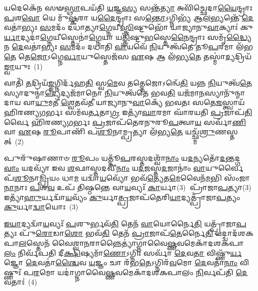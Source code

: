 \setcounter{anuvakam}{0}
𑌯𑌦𑍇𑌕𑍇᳴𑌨 𑌸𑍟\-\ul{𑌸𑍍𑌥𑌾}\-𑌪𑌯᳴𑌤𑌿 \ul{𑌯}\-𑌜𑍍𑌞\-\ul{𑌸𑍍𑌯} 𑌸𑌨𑍍𑌤᳴\-\ul{𑌤𑍍𑌯𑌾} 𑌅𑌵𑌿᳴𑌚𑍍𑌛𑍇𑌦𑌾\-\ul{𑌯𑍈}\-𑌨𑍍𑌦𑍍𑌰𑌾𑌃 \ul{𑌪}\-𑌶\-\ul{𑌵𑍋} 𑌯𑍇 𑌮𑍁᳴\-\ul{𑌷𑍍𑌕}\-𑌰𑌾 𑌯\-\ul{𑌦𑍈}\-𑌨𑍍𑌦𑍍𑌰𑌾𑌃 𑌸\-\ul{𑌨𑍍𑌤𑍋}\-\-𑌽𑌗𑍍𑌨𑌿𑌭𑍍𑌯᳴ 𑌆\-\ul{𑌲}\-𑌭𑍍𑌯𑌨𑍍𑌤𑍇᳴ \ul{𑌦𑍇}\-𑌵𑌤𑌾॑𑌭𑍍𑌯𑌃 \ul{𑌸}\-𑌮𑌦𑌂᳴ 𑌦𑌧𑌾𑌤𑍍𑌯𑌾\-\ul{𑌗𑍍𑌨𑍇}\-𑌯𑍀\-\ul{𑌸𑍍𑌤𑍍𑌰𑌿}\-𑌷𑍍𑌟𑍁𑌭𑍋᳴ 𑌯𑌾𑌜𑍍𑌯𑌾𑌨𑍁\-\ul{𑌵𑌾}\-𑌕𑍍𑌯𑌾𑌃॑ 𑌕𑍁\-\ul{𑌰𑍍𑌯𑌾}\-𑌦𑍍𑌯𑌦𑌾॑\-\ul{𑌗𑍍𑌨𑍇}\-𑌯𑍀𑌸𑍍𑌤𑍇𑌨𑌾॑\-\ul{𑌗𑍍𑌨𑍇}\-𑌯𑌾 𑌯\-\ul{𑌤𑍍𑌤𑍍𑌰𑌿}\-𑌷𑍍𑌟𑍁\-\ul{𑌭}\-𑌸𑍍𑌤𑍇\-\ul{𑌨𑍈}\-𑌨𑍍𑌦𑍍𑌰𑌾𑌃 𑌸𑌮𑍃᳴\-\ul{𑌦𑍍𑌧𑍍𑌯𑍈} 𑌨 \ul{𑌦𑍇}\-𑌵𑌤𑌾॑𑌭𑍍𑌯𑌃 \ul{𑌸}\-𑌮𑌦𑌂᳴ 𑌦𑌧𑌾𑌤𑌿 \ul{𑌵𑌾}\-𑌯𑌵𑍇᳴ \ul{𑌨𑌿}\-𑌯𑍁𑌤𑍍𑌵᳴𑌤𑍇 𑌤𑍂\-\ul{𑌪}\-𑌰𑌮𑌾 𑌲᳴𑌭\-\ul{𑌤𑍇} 𑌤𑍇\-\ul{𑌜𑍋}\-\-𑌽𑌗𑍍𑌨𑍇\-\ul{𑌰𑍍𑌵𑌾}\-𑌯𑍁𑌸𑍍𑌤𑍇𑌜᳴𑌸 \ul{𑌏}\-𑌷 𑌆 𑌲᳴𑌭𑍍𑌯\-\ul{𑌤𑍇} 𑌤𑌸𑍍𑌮𑌾॑\-\ul{𑌦𑍍𑌯}\-𑌦𑍍𑌰𑌿𑌯᳴\-\ul{𑌙𑍍𑌵𑌾}\-𑌯𑍁𑌃~(1)

𑌵𑌾𑌤𑌿᳴ \ul{𑌤}\-𑌦𑍍𑌰𑌿𑌯᳴\-\ul{𑌙𑍍𑌙}\-𑌗𑍍𑌨𑌿𑌰𑍍𑌦᳴𑌹\-\ul{𑌤𑌿} 𑌸𑍍𑌵\-\ul{𑌮𑍇}\-𑌵 𑌤𑌤𑍍𑌤𑍇𑌜𑍋\-𑌽𑌨𑍍𑌵𑍇᳴\-\ul{𑌤𑌿} 𑌯𑌨𑍍𑌨 \ul{𑌨𑌿}\-𑌯𑍁𑌤𑍍𑌵᳴\-\ul{𑌤𑍇} 𑌸𑍍𑌯𑌾𑌦𑍁𑌨𑍍𑌮𑌾॑\-\ul{𑌦𑍍𑌯𑍇}\-𑌦𑍍𑌯𑌜᳴𑌮𑌾𑌨𑍋 \ul{𑌨𑌿}\-𑌯𑍁𑌤𑍍𑌵᳴𑌤𑍇 𑌭𑌵\-\ul{𑌤𑌿} 𑌯𑌜᳴𑌮𑌾\-\ul{𑌨}\-𑌸𑍍𑌯𑌾𑌨𑍁᳴𑌨𑍍𑌮𑌾𑌦𑌾𑌯 𑌵𑌾\-\ul{𑌯𑍁}\-𑌮𑌤𑍀॑ \ul{𑌶𑍍𑌵𑍇}\-𑌤𑌵᳴𑌤𑍀 𑌯𑌾𑌜𑍍𑌯𑌾𑌨𑍁\-\ul{𑌵𑌾}\-𑌕𑍍𑌯𑍇᳴ 𑌭𑌵𑌤𑌃 𑌸𑌤𑍇\-\ul{𑌜}\-𑌸𑍍𑌤𑍍𑌵𑌾𑌯᳴ 𑌹𑌿𑌰𑌣𑍍𑌯\-\ul{𑌗}\-𑌰𑍍𑌭𑌃 𑌸𑌮᳴𑌵\-\ul{𑌰𑍍𑌤}\-𑌤𑌾\-\ul{𑌗𑍍𑌰} 𑌇𑌤𑍍𑌯𑌾᳴\-\ul{𑌘𑌾}\-𑌰𑌮𑌾 𑌘𑌾᳴𑌰𑌯𑌤𑌿 \ul{𑌪𑍍𑌰}\-𑌜𑌾𑌪᳴\-\ul{𑌤𑌿}\-𑌰𑍍𑌵𑍈 𑌹𑌿᳴𑌰𑌣𑍍𑌯\-\ul{𑌗}\-𑌰𑍍𑌭𑌃 \ul{𑌪𑍍𑌰}\-𑌜𑌾𑌪᳴𑌤𑍇𑌰𑌨𑍁𑌰𑍂\-\ul{𑌪}\-𑌤𑍍𑌵𑌾\-\ul{𑌯} 𑌸𑌰𑍍𑌵𑌾᳴\-\ul{𑌣𑌿} 𑌵𑌾 \ul{𑌏}\-𑌷 \ul{𑌰𑍂}\-𑌪𑌾𑌣𑌿᳴ 𑌪\-\ul{𑌶𑍂}\-𑌨𑌾𑌮𑍍𑌪𑍍𑌰𑌤𑍍𑌯𑌾 𑌲᳴𑌭𑍍𑌯\-\ul{𑌤𑍇} 𑌯𑌚𑍍𑌛𑍍𑌮᳴\-\ul{𑌶𑍍𑌰𑍁}\-𑌣𑌸𑍍𑌤𑌤𑍍~(2)

𑌪𑍁𑌰𑍁᳴𑌷𑌾𑌣𑌾𑍞 \ul{𑌰𑍂}\-𑌪𑌂 𑌯𑌤𑍍𑌤𑍂᳴\-\ul{𑌪}\-𑌰𑌸𑍍𑌤𑌦𑌶𑍍𑌵𑌾᳴\-\ul{𑌨𑌾𑌂} 𑌯\-\ul{𑌦}\-𑌨𑍍𑌯𑌤𑍋᳴\-\ul{𑌦}\-𑌨𑍍𑌤𑌦𑍍𑌗\-\ul{𑌵𑌾𑌂} 𑌯𑌦𑌵𑍍𑌯𑌾᳴ 𑌇𑌵 \ul{𑌶}\-𑌫𑌾𑌸𑍍𑌤𑌦𑌵𑍀᳴\-\ul{𑌨𑌾𑌂} 𑌯\-\ul{𑌦}\-𑌜𑌸𑍍𑌤\-\ul{𑌦}\-𑌜𑌾𑌨𑌾𑌂॑ \ul{𑌵𑌾}\-𑌯𑍁𑌰𑍍𑌵𑍈 𑌪᳴\-\ul{𑌶𑍂}\-𑌨𑌾\-\ul{𑌮𑍍𑌪𑍍𑌰𑌿}\-𑌯𑌂 𑌧𑌾\-\ul{𑌮} 𑌯𑌦𑍍𑌵𑌾᳴\-\ul{𑌯}\-𑌵𑍍𑌯𑍋᳴ 𑌭𑌵᳴\-\ul{𑌤𑍍𑌯𑍇}\-𑌤\-\ul{𑌮𑍇}\-𑌵𑍈𑌨᳴\-\ul{𑌮}\-𑌭𑌿 𑌸𑌂᳴𑌜𑌾\-\ul{𑌨𑌾}\-𑌨𑌾𑌃 \ul{𑌪}\-𑌶\-\ul{𑌵} 𑌉𑌪᳴ 𑌤𑌿𑌷𑍍𑌠𑌨𑍍𑌤𑍇 𑌵𑌾\-\ul{𑌯}\-𑌵𑍍𑌯𑌃᳴ \ul{𑌕𑌾}\-𑌰𑍍𑌯𑌾(3)𑌃 𑌪𑍍𑌰𑌾᳴𑌜𑌾\-\ul{𑌪}\-𑌤𑍍𑌯𑌾(3) 𑌇𑌤𑍍𑌯𑌾᳴\-\ul{𑌹𑍁}\-𑌰𑍍𑌯𑌦𑍍𑌵𑌾᳴\-\ul{𑌯}\-𑌵𑍍𑌯𑌂᳴ \ul{𑌕𑍁}\-𑌰𑍍𑌯𑌾\-\ul{𑌤𑍍𑌪𑍍𑌰}\-𑌜𑌾𑌪᳴𑌤𑍇𑌰𑌿\-\ul{𑌯𑌾}\-𑌦𑍍𑌯𑌤𑍍𑌪𑍍𑌰𑌾᳴𑌜𑌾\-\ul{𑌪}\-𑌤𑍍𑌯𑌂 \ul{𑌕𑍁}\-𑌰𑍍𑌯𑌾\-\ul{𑌦𑍍𑌵𑌾}\-𑌯𑍋𑌃~(3)

\-\ul{𑌇}\-\-\ul{𑌯𑌾}\-𑌦𑍍𑌯𑌦𑍍𑌵𑌾᳴\-\ul{𑌯}\-𑌵𑍍𑌯𑌃᳴ \ul{𑌪}\-𑌶𑍁𑌰𑍍𑌭𑌵᳴\-\ul{𑌤𑌿} 𑌤𑍇𑌨᳴ \ul{𑌵𑌾}\-𑌯𑍋𑌰𑍍𑌨𑍈\-\ul{𑌤𑌿} 𑌯𑌤𑍍𑌪𑍍𑌰𑌾᳴𑌜𑌾\-\ul{𑌪}\-𑌤𑍍𑌯𑌃 𑌪𑍁᳴\-\ul{𑌰𑍋}\-𑌡𑌾\-\ul{𑌶𑍋} 𑌭𑌵᳴\-\ul{𑌤𑌿} 𑌤𑍇𑌨᳴ \ul{𑌪𑍍𑌰𑌾}\-𑌜𑌾𑌪᳴\-\ul{𑌤𑍇}\-𑌰𑍍𑌨𑍈\-\ul{𑌤𑌿} 𑌯𑌦𑍍𑌦𑍍𑌵𑌾𑌦᳴𑌶\-𑌕𑌪𑌾\-\ul{𑌲}\-𑌸𑍍𑌤𑍇𑌨᳴ 𑌵𑍈𑌶𑍍𑌵𑌾\-\ul{𑌨}\-𑌰𑌾𑌨𑍍𑌨𑍈𑌤𑍍𑌯𑌾॑𑌗𑍍𑌨𑌾𑌵𑍈\-\ul{𑌷𑍍𑌣}\-𑌵𑌮𑍇𑌕𑌾᳴\-𑌦𑌶\-𑌕𑌪𑌾\-\ul{𑌲𑌂} 𑌨𑌿𑌰𑍍𑌵᳴𑌪𑌤𑌿 𑌦𑍀\-\ul{𑌕𑍍𑌷𑌿}\-𑌷𑍍𑌯𑌮𑌾᳴\-\ul{𑌣𑍋}\-\-𑌽𑌗𑍍𑌨𑌿𑌃 𑌸𑌰𑍍𑌵𑌾᳴ \ul{𑌦𑍇}\-𑌵\-\ul{𑌤𑌾} 𑌵𑌿𑌷𑍍𑌣𑍁᳴\-\ul{𑌰𑍍𑌯}\-𑌜𑍍𑌞𑍋 \ul{𑌦𑍇}\-𑌵𑌤𑌾॑\-\ul{𑌶𑍍𑌚𑍈}\-𑌵 \ul{𑌯}\-𑌜𑍍𑌞𑌂 𑌚𑌾 𑌰᳴𑌭\-\ul{𑌤𑍇}\-\-𑌽𑌗𑍍𑌨𑌿𑌰᳴\-\ul{𑌵}\-𑌮𑍋 \ul{𑌦𑍇}\-𑌵𑌤𑌾᳴\-\ul{𑌨𑌾𑌂} 𑌵𑌿𑌷𑍍𑌣𑍁𑌃᳴ 𑌪\-\ul{𑌰}\-𑌮𑍋 𑌯𑌦𑌾॑𑌗𑍍𑌨𑌾𑌵𑍈\-\ul{𑌷𑍍𑌣}\-𑌵𑌮𑍇𑌕𑌾᳴\-𑌦𑌶\-𑌕𑌪𑌾𑌲𑌂 \ul{𑌨𑌿}\-𑌰𑍍𑌵𑌪᳴𑌤𑌿 \ul{𑌦𑍇}\-𑌵𑌤𑌾𑌃॑~(4)

